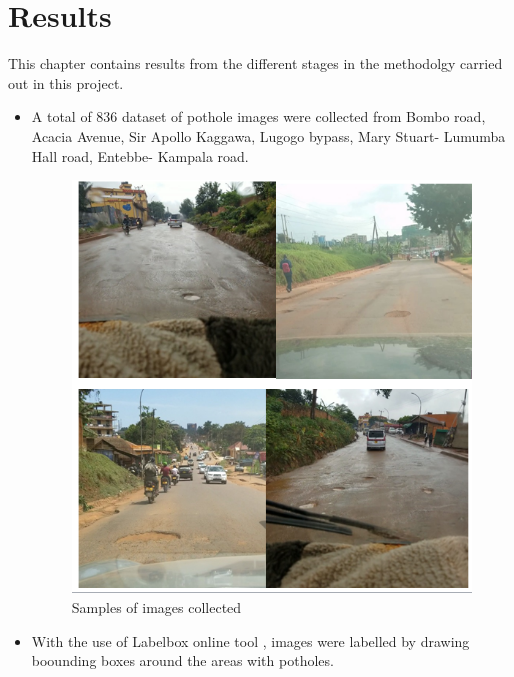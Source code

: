 \documentclass[12pt]{report}
\begin{document}
\chapter{ Results}
This chapter contains results from the different stages in the methodolgy carried out in this project.
\begin{itemize}[topsep=0pt]

\item A total of 836 dataset of  pothole images were collected from Bombo road, Acacia Avenue, Sir Apollo Kaggawa, Lugogo bypass, Mary Stuart- Lumumba Hall road, Entebbe- Kampala road.

\begin{figure}[H]\includegraphics[scale=0.9]{pothole.png}\centering\caption{Samples of images collected} \label{fig:Sample of images collected} \end{figure}%

\item With the use of Labelbox online tool , images were labelled by drawing boounding boxes around the areas with potholes.


\end{itemize}
\end{document}
